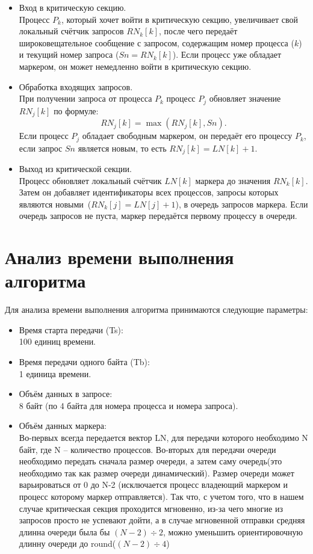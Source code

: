 \documentclass[openany, twoside, a4paper, 12pt]{extbook}
\begin{document}
\begin{itemize}
    \item Вход в критическую секцию.\\
    Процесс $P_k$, который хочет войти в критическую секцию,
	увеличивает свой локальный счётчик запросов $RN_k[k]$,
	после чего передаёт широковещательное сообщение с запросом,
	содержащим номер процесса ($k$) и текущий номер запроса ($Sn = RN_k[k]$).
	Если процесс уже обладает маркером, он может немедленно войти в критическую секцию.

    \item Обработка входящих запросов.\\
    При получении запроса от процесса $P_k$ процесс $P_j$ обновляет значение $RN_j[k]$ по формуле:
    \[
    RN_j[k] = \max(RN_j[k], Sn).
    \]
    Если процесс $P_j$ обладает свободным маркером, он передаёт его процессу $P_k$,
	если запрос $Sn$ является новым, то есть $RN_j[k] = LN[k] + 1$.

    \item Выход из критической секции.\\
    Процесс обновляет локальный счётчик $LN[k]$ маркера до значения $RN_k[k]$.
	Затем он добавляет идентификаторы всех процессов, запросы которых
	являются новыми~($RN_k[j] = LN[j] + 1$), в очередь запросов маркера.
	Если очередь запросов не пуста, маркер передаётся первому процессу в очереди.
\end{itemize}

\section*{Анализ времени выполнения алгоритма}
Для анализа времени выполнения алгоритма принимаются следующие параметры:
\begin{itemize}
    \item Время старта передачи (Ts):\\ 100 единиц времени.
    \item Время передачи одного байта (Tb):\\ 1 единица времени.
    \item Объём данных в запросе:\\ 8 байт (по 4 байта для номера процесса и номера запроса).
    \item Объём данных маркера: \\ Во-первых всегда передается вектор LN, для передачи которого необходимо N байт, 
	где N -- количество процессов. Во-вторых для передачи очереди необходимо передать сначала размер очереди,
	а затем саму очередь(это необходимо так как размер очереди динамический). Размер очереди может варьироваться от 
	0 до N-2 (исключается процесс владеющий маркером и процесс которому маркер отправляется). Так что, с учетом того, что 
	в нашем случае критическая секция проходится мгновенно, из-за чего многие из запросов просто не успевают дойти, 
	а в случае мгновенной отправки средняя длинна очереди была бы $(N-2)\div2$, можно уменьшить ориентировочную длинну очереди 
	до round($(N-2)\div4$)
\end{itemize}
\end{document}
